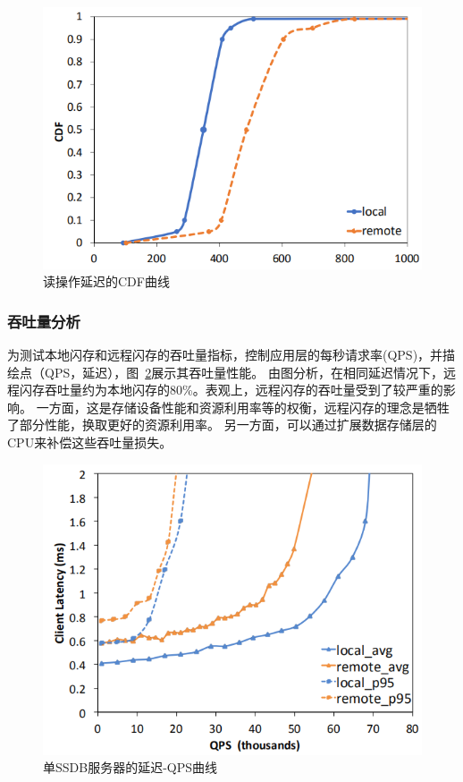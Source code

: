 \begin{figure}
\centering
\includegraphics[scale=0.8]{Figures/storage/read_latency_CDF.jpg}
\decoRule
\caption{读操作延迟的CDF曲线}
\label{fig:read_latency_CDF}
\end{figure}

\subsubsection{吞吐量分析}
为测试本地闪存和远程闪存的吞吐量指标，控制应用层的每秒请求率(QPS)，并描绘点（QPS，延迟），图~\ref{fig:QPS_latency}展示其吞吐量性能。
由图分析，在相同延迟情况下，远程闪存吞吐量约为本地闪存的80\%。表观上，远程闪存的吞吐量受到了较严重的影响。
一方面，这是存储设备性能和资源利用率等的权衡，远程闪存的理念是牺牲了部分性能，换取更好的资源利用率。
另一方面，可以通过扩展数据存储层的CPU来补偿这些吞吐量损失。

\begin{figure}
\centering
\includegraphics[scale=0.8]{Figures/storage/QPS_latency.jpg}
\decoRule
\caption{单SSDB服务器的延迟-QPS曲线}
\label{fig:QPS_latency}
\end{figure}

